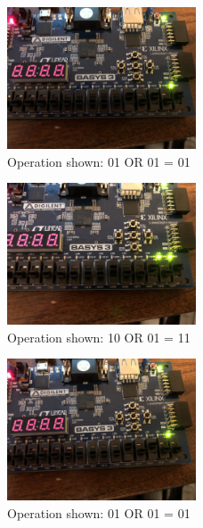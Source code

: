 \documentclass[11pt]{article}
\begin{document}
\begin{figure}[H]
\begin{center}
	\includegraphics[width=0.5\textwidth]{./images/p1/IMG_0148.jpg}
	\caption{\label{fig:alu_res1}Operation shown: 01 OR 01 = 01}
\end{center}
\end{figure}

\begin{figure}[H]
\begin{center}
	\includegraphics[width=0.5\textwidth]{./images/p1/IMG_0475.jpg}
	\caption{\label{fig:alu_res2}Operation shown: 10 OR 01 = 11}
\end{center}
\end{figure}

\begin{figure}[H]
\begin{center}
	\includegraphics[width=0.5\textwidth]{./images/p1/IMG_0525.jpg}
	\caption{\label{fig:alu_res3}Operation shown: 01 OR 01 = 01}
\end{center}
\end{figure}
\end{document}
